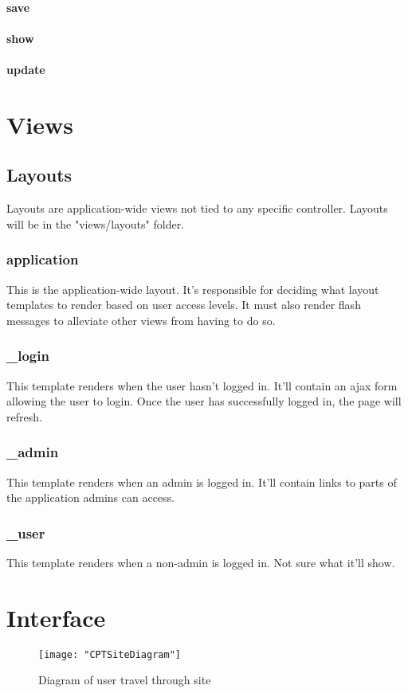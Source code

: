 \documentclass[12pt]{article}
\begin{document}
\paragraph{save}
\paragraph{show}
\paragraph{update}


\section{Views}
\subsection{Layouts}
Layouts are application-wide views not tied to any specific controller. Layouts will be in the "views/layouts" folder.
\subsubsection{application}
This is the application-wide layout. It's responsible for deciding what layout templates to render based on user access levels.
It must also render flash messages to alleviate other views from having to do so.
\subsubsection{\_login}
This template renders when the user hasn't logged in. It'll contain an ajax form allowing the user to login.
Once the user has successfully logged in, the page will refresh.
\subsubsection{\_admin}
This template renders when an admin is logged in. It'll contain links to parts of the application admins can access.
\subsubsection{\_user}
This template renders when a non-admin is logged in. Not sure what it'll show.


\section{Interface}\label{sec:Interface}
\begin{figure}[H]
\begin{center}
\texttt{[image: "CPTSiteDiagram"]}
\caption{Diagram of user  travel through site}
\label{fig:dia}
\end{center}
\end{figure}
\end{document}
